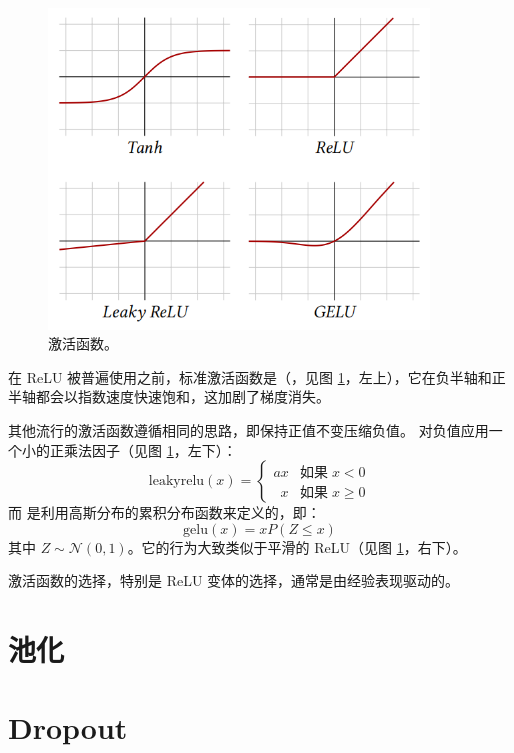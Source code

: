  \begin{figure}
    \centering
    \includegraphics[width=0.9\textwidth]{fig/fig4.5.png}
    \caption[激活函数]{激活函数。}
    \label{fig4.5}
\end{figure}

在 ReLU 被普遍使用之前，标准激活函数是（，见图 \ref{fig4.5}，左上），它在负半轴和正半轴都会以指数速度快速饱和，这加剧了梯度消失。

其他流行的激活函数遵循相同的思路，即保持正值不变压缩负值。 \citep{relu_hybrid_icml2013_final} 对负值应用一个小的正乘法因子（见图 \ref{fig4.5}，左下）：
$$
\text{leakyrelu}(x) = \begin{cases}
    ax &\text{如果}\; x < 0 \\
    \enspace x &\text{如果}\; x \ge 0
 \end{cases}
 $$
 而  \citep{arxiv-1606.08415} 是利用高斯分布的累积分布函数来定义的，即：
 \[\text{gelu}(x) = xP(Z \le x)\]
 其中 $Z \sim \mathcal{N} (0,1)$。它的行为大致类似于平滑的 ReLU（见图 \ref{fig4.5}，右下）。

 激活函数的选择，特别是 ReLU 变体的选择，通常是由经验表现驱动的。

\section{池化}\label{sec4.4}

\section{Dropout}\label{sec4.5}

